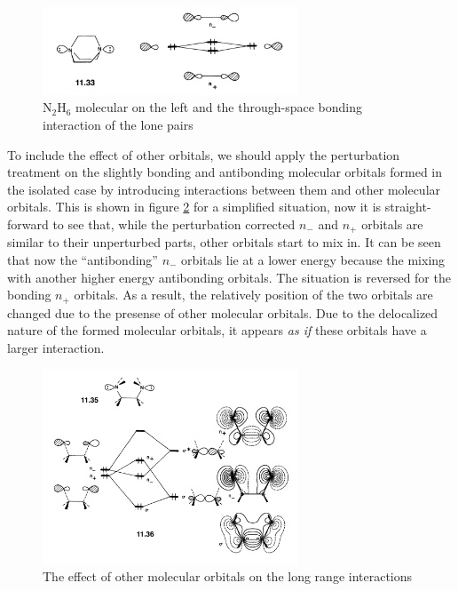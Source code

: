 \documentclass{article}
\begin{document}
\begin{figure}
    \centering
    \includegraphics[width=3in]{F_non_interacting_lone_pair.png}
    \caption{N$_2$H$_6$ molecular on the left and the through-space bonding interaction of the lone pairs}
    \label{F:N2H6_lone_pairs}
\end{figure}

To include the effect of other orbitals, we should apply the perturbation treatment on the slightly bonding and antibonding 
molecular orbitals formed in the isolated case by introducing interactions between them and other molecular orbitals. This 
is shown in figure \ref{F:through-bond} for a simplified situation, now it is straight-forward to see that, while the 
perturbation corrected $n_-$ and $n_+$ orbitals are similar to their unperturbed parts, other orbitals start to 
mix in. It can be seen that now the ``antibonding'' $n_-$ orbitals lie at a lower energy because the mixing with 
another higher energy antibonding orbitals. The situation is reversed for the bonding $n_+$ orbitals. As a result, 
the relatively position of the two orbitals are changed due to the presense of other molecular orbitals. Due to the delocalized 
nature of the formed molecular orbitals, it appears \emph{as if} these orbitals have a larger interaction.

\begin{figure}
    \centering
    \includegraphics[width=3in]{F_through_bond.png}
    \caption{The effect of other molecular orbitals on the long range interactions}
    \label{F:through-bond}
\end{figure}
\end{document}
